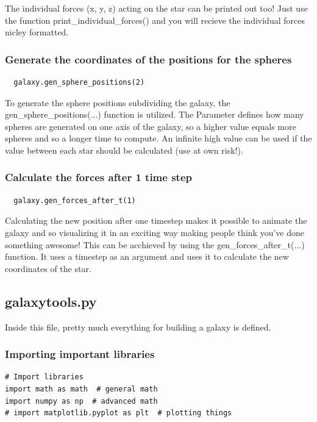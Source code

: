 The individual forces (x, y, z) acting on the star can be printed out too!
Just use the function print\_individual\_forces() and you will recieve the
individual forces nicley formatted.

\subsubsection{Generate the coordinates of the positions for the spheres}

\begin{lstlisting}
  galaxy.gen_sphere_positions(2)
\end{lstlisting}

To generate the sphere positions subdividing the galaxy, the
gen\_sphere\_positions(...) function is utilized. The Parameter defines how
many spheres are generated on one axis of the galaxy, so a higher value equals
more spheres and so a longer time to compute. An infinite high value can be used
if the value between each star should be calculated (use at own risk!).

\subsubsection{Calculate the forces after 1 time step}

\begin{lstlisting}
  galaxy.gen_forces_after_t(1)
\end{lstlisting}

Calculating the new position after one timestep makes it possible to animate
the galaxy and so visualizing it in an exciting way making people think you've
done something awesome! This can be acchieved by using the
gen\_forces\_after\_t(...) function. It uses a timestep as an argument and
uses it to calculate the new coordinates of the star.

\subsection{galaxytools.py}

Inside this file, pretty much everything for building a galaxy is defined.

\subsubsection{Importing important libraries}

\begin{lstlisting}
# Import libraries
import math as math  # general math
import numpy as np  # advanced math
# import matplotlib.pyplot as plt  # plotting things
\end{lstlisting}

